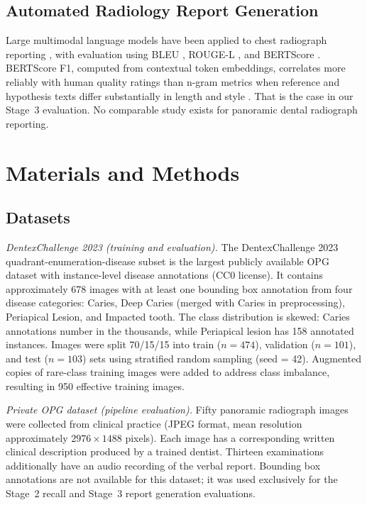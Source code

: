\documentclass[conference]{IEEEtran}
\begin{document}
\subsection{Automated Radiology Report Generation}

Large multimodal language models have been applied to chest radiograph reporting \cite{liu2025report}, with evaluation using BLEU \cite{papineni2002}, ROUGE-L \cite{lin2004}, and BERTScore \cite{zhang2020bert}. BERTScore F1, computed from contextual token embeddings, correlates more reliably with human quality ratings than n-gram metrics when reference and hypothesis texts differ substantially in length and style \cite{zhang2020bert}. That is the case in our Stage~3 evaluation. No comparable study exists for panoramic dental radiograph reporting.

\section{Materials and Methods}

\subsection{Datasets}

\textit{DentexChallenge 2023 (training and evaluation).}
The DentexChallenge 2023 quadrant-enumeration-disease subset \cite{dentex2023} is the largest publicly available OPG dataset with instance-level disease annotations (CC0 license). It contains approximately 678 images with at least one bounding box annotation from four disease categories: Caries, Deep Caries (merged with Caries in preprocessing), Periapical Lesion, and Impacted tooth. The class distribution is skewed: Caries annotations number in the thousands, while Periapical lesion has 158 annotated instances. Images were split 70/15/15 into train ($n = 474$), validation ($n = 101$), and test ($n = 103$) sets using stratified random sampling (seed = 42). Augmented copies of rare-class training images were added to address class imbalance, resulting in 950 effective training images.

\textit{Private OPG dataset (pipeline evaluation).}
Fifty panoramic radiograph images were collected from clinical practice (JPEG format, mean resolution approximately $2976 \times 1488$ pixels). Each image has a corresponding written clinical description produced by a trained dentist. Thirteen examinations additionally have an audio recording of the verbal report. Bounding box annotations are not available for this dataset; it was used exclusively for the Stage~2 recall and Stage~3 report generation evaluations.
\end{document}
